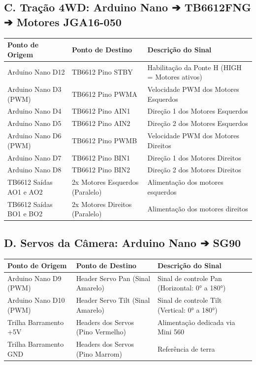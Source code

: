 \documentclass[11pt,a4paper]{article}
\begin{document}
\subsection{C. Tração 4WD: Arduino Nano ➔ TB6612FNG ➔ Motores JGA16-050}
\begin{table}[h!]
\centering
\small
\begin{tabularx}{\textwidth}{p{4.5cm} p{5.5cm} X}
\toprule
\rowcolor{tablehead} \color{white}\textbf{Ponto de Origem} & \color{white}\textbf{Ponto de Destino} & \color{white}\textbf{Descrição do Sinal} \\
\midrule
Arduino Nano D12 & TB6612 Pino STBY & Habilitação da Ponte H (HIGH = Motores ativos) \\
\rowcolor{tablezebra} Arduino Nano D3 (PWM) & TB6612 Pino PWMA & Velocidade PWM dos Motores Esquerdos \\
Arduino Nano D4 & TB6612 Pino AIN1 & Direção 1 dos Motores Esquerdos \\
\rowcolor{tablezebra} Arduino Nano D5 & TB6612 Pino AIN2 & Direção 2 dos Motores Esquerdos \\
Arduino Nano D6 (PWM) & TB6612 Pino PWMB & Velocidade PWM dos Motores Direitos \\
\rowcolor{tablezebra} Arduino Nano D7 & TB6612 Pino BIN1 & Direção 1 dos Motores Direitos \\
Arduino Nano D8 & TB6612 Pino BIN2 & Direção 2 dos Motores Direitos \\
\rowcolor{tablezebra} TB6612 Saídas AO1 e AO2 & 2x Motores Esquerdos (Paralelo) & Alimentação dos motores esquerdos \\
TB6612 Saídas BO1 e BO2 & 2x Motores Direitos (Paralelo) & Alimentação dos motores direitos \\
\bottomrule
\end{tabularx}
\end{table}

\subsection{D. Servos da Câmera: Arduino Nano ➔ SG90}
\begin{table}[h!]
\centering
\small
\begin{tabularx}{\textwidth}{p{4.5cm} p{5.5cm} X}
\toprule
\rowcolor{tablehead} \color{white}\textbf{Ponto de Origem} & \color{white}\textbf{Ponto de Destino} & \color{white}\textbf{Descrição do Sinal} \\
\midrule
Arduino Nano D9 (PWM) & Header Servo Pan (Sinal Amarelo) & Sinal de controle Pan (Horizontal: 0° a 180°) \\
\rowcolor{tablezebra} Arduino Nano D10 (PWM) & Header Servo Tilt (Sinal Amarelo) & Sinal de controle Tilt (Vertical: 0° a 180°) \\
Trilha Barramento +5V & Headers dos Servos (Pino Vermelho) & Alimentação dedicada via Mini 560 \\
\rowcolor{tablezebra} Trilha Barramento GND & Headers dos Servos (Pino Marrom) & Referência de terra \\
\bottomrule
\end{tabularx}
\end{table}
\end{document}
